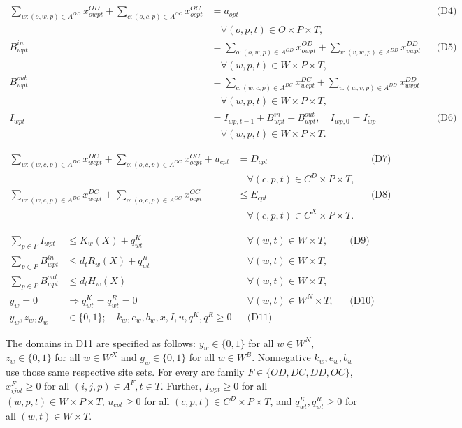 \documentclass[
  english,
  11pt,
  a4paper,
  authoryear,
  preprint]{elsarticle}
\begin{document}
\[
\begin{aligned}
\sum_{w:(o,w,p)\in A^{OD}}x^{OD}_{owpt}
 +\sum_{c:(o,c,p)\in A^{OC}}x^{OC}_{ocpt}
 &=a_{opt} &&\text{(D4)}\\
 &\quad\forall(o,p,t)\in O\times P\times T,\\
B^{in}_{wpt}&=\sum_{o:(o,w,p)\in A^{OD}}x^{OD}_{owpt}
 +\sum_{v:(v,w,p)\in A^{DD}}x^{DD}_{vwpt}
 &&\text{(D5)}\\
 &\quad\forall(w,p,t)\in W\times P\times T,\\
B^{out}_{wpt}&=\sum_{c:(w,c,p)\in A^{DC}}x^{DC}_{wcpt}
 +\sum_{v:(w,v,p)\in A^{DD}}x^{DD}_{wvpt}\\
 &\quad\forall(w,p,t)\in W\times P\times T,\\
I_{wpt}&=I_{wp,t-1}+B^{in}_{wpt}-B^{out}_{wpt},\quad I_{wp,0}=I^0_{wp}
 &&\text{(D6)}\\
 &\quad\forall(w,p,t)\in W\times P\times T.
\end{aligned}
\]

\[
\begin{aligned}
\sum_{w:(w,c,p)\in A^{DC}}x^{DC}_{wcpt}
 +\sum_{o:(o,c,p)\in A^{OC}}x^{OC}_{ocpt}+u_{cpt}
 &=D_{cpt} &&\text{(D7)}\\
 &\quad\forall(c,p,t)\in C^D\times P\times T,\\
\sum_{w:(w,c,p)\in A^{DC}}x^{DC}_{wcpt}
 +\sum_{o:(o,c,p)\in A^{OC}}x^{OC}_{ocpt}
 &\le E_{cpt} &&\text{(D8)}\\
 &\quad\forall(c,p,t)\in C^X\times P\times T.
\end{aligned}
\]

\[
\begin{aligned}
\sum_{p\in P}I_{wpt}&\le K_w(X)+q^K_{wt} &&\forall(w,t)\in W\times T, &&\text{(D9)}\\
\sum_{p\in P}B^{in}_{wpt}&\le d_tR_w(X)+q^R_{wt} &&\forall(w,t)\in W\times T,\\
\sum_{p\in P}B^{out}_{wpt}&\le d_tH_w(X) &&\forall(w,t)\in W\times T,\\
y_w=0&\Longrightarrow q^K_{wt}=q^R_{wt}=0
 &&\forall(w,t)\in W^N\times T, &&\text{(D10)}\\
y_w,z_w,g_w&\in\{0,1\};\quad k_w,e_w,b_w,x,I,u,q^K,q^R\ge0 &&\text{(D11)}
\end{aligned}
\]

The domains in D11 are specified as follows: \(y_w\in\{0,1\}\) for all
\(w\in W^N\), \(z_w\in\{0,1\}\) for all \(w\in W^X\) and
\(g_w\in\{0,1\}\) for all \(w\in W^B\). Nonnegative \(k_w,e_w,b_w\) use
those same respective site sets. For every arc family
\(F\in\{OD,DC,DD,OC\}\), \(x^F_{ijpt}\ge0\) for all
\((i,j,p)\in A^F,t\in T\). Further, \(I_{wpt}\ge0\) for all
\((w,p,t)\in W\times P\times T\), \(u_{cpt}\ge0\) for all
\((c,p,t)\in C^D\times P\times T\), and \(q^K_{wt},q^R_{wt}\ge0\) for
all \((w,t)\in W\times T\).
\end{document}
